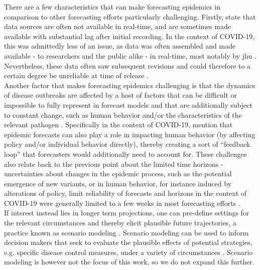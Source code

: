 There are a few characteristics that can make forecasting epidemics in comparison to other forecasting efforts particularly challenging. Firstly, \cite{jajosky_evaluation_2004} state that data sources are often not available in real-time, and are sometimes made available with substantial lag after initial recording. In the context of COVID-19, this was admittedly less of an issue, as data was often assembled and made available - to researchers and the public alike - in real-time, most notably by \ac{jhu} \citep{dong_interactive_2020}. Nevertheless, these data often saw subsequent revisions and could therefore to a certain degree be unreliable at time of release \citep{sherratt_european_2022}.\\
Another factor that makes forecasting epidemics challenging is that the dynamics of disease outbreaks are affected by a host of factors that can be difficult or impossible to fully represent in forecast models and that are additionally subject to constant change, such as human behavior and/or the characteristics of the relevant pathogen \citep{moran_epidemic_2016}. Specifically in the context of COVID-19, \cite{cramer_evaluation_2022} mention that epidemic forecasts can also play a role in impacting human behavior (by affecting policy and/or individual behavior directly), thereby creating a sort of ``feedback loop'' that forecasters would additionally need to account for. These challenges also relate back to the previous point about the limited time horizons - uncertainties about changes in the epidemic process, such as the potential emergence of new variants, or in human behavior, for instance induced by alterations of policy, limit reliability of forecasts and horizons in the context of COVID-19 were generally limited to a few weeks in most forecasting efforts \citep{reich_collaborative_2022}.\\
If interest instead lies in longer term projections, one can pre-define settings for the relevant circumstances and thereby elicit plausible future trajectories, a practice known as scenario modeling \citep{reich_collaborative_2022}. Scenario modeling can be used to inform decision makers that seek to evaluate the plausible effects of potential strategies, e.g. specific disease control measures, under a variety of circumstances \citep{reich_collaborative_2022}. Scenario modeling is however not the focus of this work, so we do not expand this further. \medskip\\
